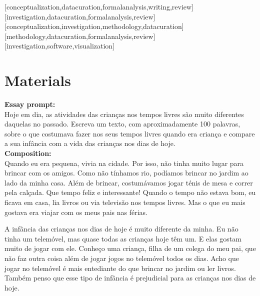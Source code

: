 \documentclass[english]{textolivre}
\begin{document}
\printbibliography\label{sec-bib}


\begin{contributors}
[conceptualization,datacuration,formalanalysis,writing,review]
[investigation,datacuration,formalanalysis,review]
[conceptualization,investigation,methodology,datacuration]
[methodology,datacuration,formalanalysis,review]
[investigation,software,visualization]

\end{contributors}



\begin{dataavailability}
\end{dataavailability}

\appendix
\section{Materials}
\label{app:materials}

\textbf{Essay prompt:} \\
Hoje em dia, as atividades das crianças nos tempos livres são muito diferentes daquelas no passado. Escreva um texto, com aproximadamente 100 palavras, sobre o que costumava fazer nos seus tempos livres quando era criança e compare a sua infância com a vida das crianças nos dias de hoje.\\

\noindent\textbf{Composition:} \\
Quando eu era pequena, vivia na cidade. Por isso, não tinha muito lugar para brincar com os amigos. Como não tínhamos rio, podíamos brincar no jardim ao lado da minha casa. Além de brincar, costumávamos jogar ténis de mesa e correr pela calçada. Que tempo feliz e interessante! Quando o tempo não estava bom, eu ficava em casa, lia livros ou via televisão nos tempos livres. Mas o que eu mais gostava era viajar com os meus pais nas férias.  

A infância das crianças nos dias de hoje é muito diferente da minha. Eu não tinha um telemóvel, mas quase todas as crianças hoje têm um. E elas gostam muito de jogar com ele. Conheço uma criança, filha de um colega do meu pai, que não faz outra coisa além de jogar jogos no telemóvel todos os dias. Acho que jogar no telemóvel é mais entediante do que brincar no jardim ou ler livros. Também penso que esse tipo de infância é prejudicial para as crianças nos dias de hoje.\\
\end{document}

